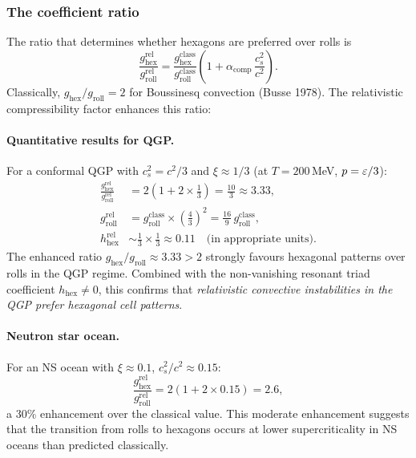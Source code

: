 \subsubsection*{The coefficient ratio}

The ratio that determines whether hexagons are preferred over
rolls is
\begin{equation}
\label{eq:rel-g-ratio}
\boxed{
\frac{g_{\mathrm{hex}}^{\mathrm{rel}}}{g_{\mathrm{roll}}^{\mathrm{rel}}}
= \frac{g_{\mathrm{hex}}^{\mathrm{class}}}
       {g_{\mathrm{roll}}^{\mathrm{class}}}
  \left(1 + \alpha_{\mathrm{comp}}\,\frac{c_s^2}{c^2}\right).
}
\end{equation}
Classically, $g_{\mathrm{hex}}/g_{\mathrm{roll}} = 2$ for
Boussinesq convection (Busse 1978).  The relativistic
compressibility factor enhances this ratio:

\paragraph{Quantitative results for QGP.}
For a conformal QGP with $c_s^2 = c^2/3$ and $\xi \approx 1/3$
(at $T = 200$\,MeV, $p = \varepsilon/3$):
\begin{align}
\frac{g_{\mathrm{hex}}^{\mathrm{rel}}}{g_{\mathrm{roll}}^{\mathrm{rel}}}
&= 2\left(1 + 2\times\tfrac{1}{3}\right) = \frac{10}{3} \approx 3.33,
\\[4pt]
g_{\mathrm{roll}}^{\mathrm{rel}}
&= g_{\mathrm{roll}}^{\mathrm{class}}\times\left(\frac{4}{3}\right)^2
= \frac{16}{9}\,g_{\mathrm{roll}}^{\mathrm{class}}, \\[4pt]
h_{\mathrm{hex}}^{\mathrm{rel}}
&\sim \frac{1}{3}\times\frac{1}{3} \approx 0.11
  \quad\text{(in appropriate units)}.
\end{align}
The enhanced ratio $g_{\mathrm{hex}}/g_{\mathrm{roll}} \approx
3.33 > 2$ strongly favours hexagonal patterns over rolls in the
QGP regime.  Combined with the non-vanishing resonant triad
coefficient $h_{\mathrm{hex}} \neq 0$, this confirms that
\emph{relativistic convective instabilities in the QGP prefer
hexagonal cell patterns}.

\paragraph{Neutron star ocean.}
For an NS ocean with $\xi \approx 0.1$, $c_s^2/c^2 \approx 0.15$:
\begin{equation}
\frac{g_{\mathrm{hex}}^{\mathrm{rel}}}{g_{\mathrm{roll}}^{\mathrm{rel}}}
= 2(1 + 2\times 0.15) = 2.6,
\end{equation}
a 30\% enhancement over the classical value.  This moderate
enhancement suggests that the transition from rolls to hexagons
occurs at lower supercriticality in NS oceans than predicted
classically.

